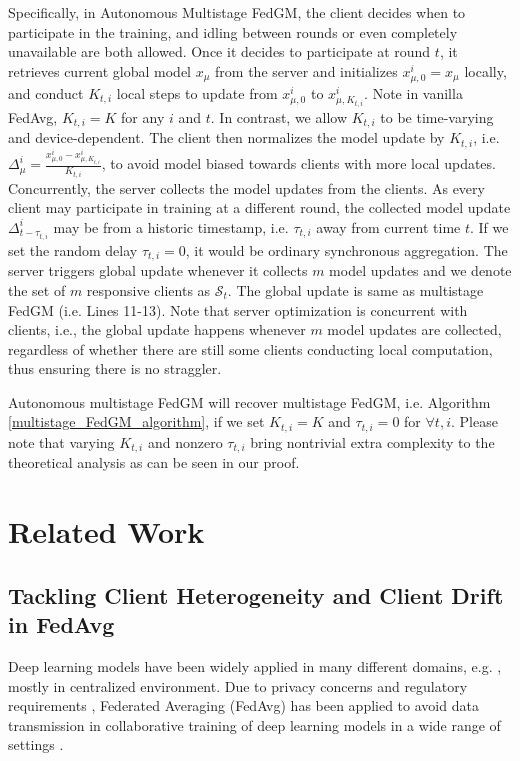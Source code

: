 Specifically, in Autonomous Multistage FedGM, the client decides when to participate in the training, and idling between rounds or even completely unavailable are both allowed. Once it decides to participate at round $t$, it retrieves current global model $x_\mu$ from the server and initializes $x_{\mu,0}^i=x_\mu$ locally, and conduct $K_{t,i}$ local steps to update from $x_{\mu,0}^i$ to $x^i_{\mu,K_{t,i}}$. Note in vanilla FedAvg, $K_{t,i}=K$ for any $i$ and $t$. In contrast, we allow $K_{t,i}$ to be time-varying and device-dependent. The client then normalizes the model update by $K_{t,i}$, i.e. $\Delta_\mu^i=\frac{x_{\mu,0}^i-x_{\mu,K_{t,i}}^i}{K_{t,i}}$, to avoid model biased towards clients with more local updates. Concurrently, the server collects the model updates from the clients. As every client may participate in training at a different round, the collected model update $\Delta_{t-\tau_{t,i}}^i$ may be from a historic timestamp, i.e. $\tau_{t,i}$ away from current time $t$. If we set the random delay $\tau_{t,i}=0$, it would be ordinary synchronous aggregation. The server triggers global update whenever it collects $m$ model updates and we denote the set of $m$ responsive clients as $\mathcal{S}_t$. The global update is same as multistage FedGM (i.e. Lines 11-13). Note that server optimization is concurrent with clients, i.e., the global update happens whenever $m$ model updates are collected, regardless of whether there are still some clients conducting local computation, thus ensuring there is no straggler.


Autonomous multistage FedGM will recover multistage FedGM, i.e. Algorithm \ref{multistage_FedGM_algorithm}, if we set $K_{t,i}=K$ and $\tau_{t,i}=0$ for $\forall t, i$. Please note that varying $K_{t,i}$ and nonzero $\tau_{t,i}$ bring nontrivial extra complexity to the theoretical analysis as can be seen in our proof.


\section{Related Work}
\label{sec:related_work}

\subsection{Tackling Client Heterogeneity and Client Drift in FedAvg}
\label{subsec:fedavg_related_work}

Deep learning models have been widely applied in many different domains, e.g. \cite{Mnih2013PlayingAW,He2016DeepResNet,Devlin2019BERT,Jure2017GNN,google16deep&wide,SuoICHI19,Xun2020CorrelationNF,Wu2023DiPmarkAS}, mostly in centralized environment. Due to privacy concerns and regulatory requirements \cite{european_commission_regulation_2016,California_Consumer_Privacy_Act_CCPA}, Federated Averaging (FedAvg) \cite{McMahan2017FedAvg} has been applied to avoid data transmission in collaborative training of deep learning models in a wide range of settings \cite{Li20FedProx,rothchild20fetchsgd,Wang20FedNova,fallah2020personalized,li2021model,bao2023adaptive,wu2023federated,wu2023solving}.

